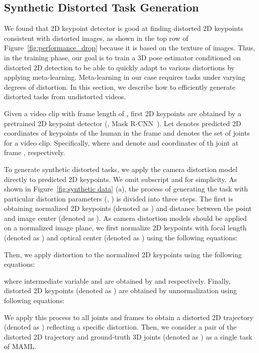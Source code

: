     \subsection{Synthetic Distorted Task Generation}
        \label{sec1}
        We found that 2D keypoint detector is good at finding distorted 2D keypoints consistent with distorted images, as shown in the top row of Figure~\ref{fig:performance_drop} because it is based on the texture of images. Thus, in the training phase, our goal is to train a 3D pose estimator conditioned on distorted 2D detection to be able to quickly adapt to various distortions by applying meta-learning. Meta-learning in our case requires tasks under varying degrees of distortion. In this section, we describe how to efficiently generate distorted tasks from undistorted videos.
        
        Given a video clip with frame length of , first 2D keypoints are obtained by a pretrained 2D keypoint detector (\eg, Mask R-CNN~\cite{ref14_He_2017_ICCV}). Let  denotes predicted 2D coordinates of  keypoints of the human in the frame and  denotes the set of joints for a video clip. Specifically,  where  and  denote  and  coordinates of th joint at frame , respectively.
        
        To generate synthetic distorted tasks, we apply the camera distortion model~\cite{ref38_CamCalibration} directly to predicted 2D keypoints. We omit subscript  and  for simplicity. As shown in Figure~\ref{fig:synthetic data} (a), the process of generating the task with particular distortion parameters (\ie, ) is divided into three steps. The first is obtaining normalized 2D keypoints (denoted as ) and distance between the point and image center (denoted as ). As camera distortion models should be applied on a normalized image plane, we first normalize 2D keypoints with focal length (denoted as ) and optical center (denoted as ) using the following equations:
        
        Then, we apply distortion to the normalized 2D keypoints using the following equations:
        
        where intermediate variable  and  are obtained by \small \normalsize and \small \normalsize respectively. Finally, distorted 2D keypoints (denoted as ) are obtained by unnormalization using following equations:
        
        
        We apply this process to all joints  and frames  to obtain a distorted 2D trajectory (denoted as ) reflecting a specific distortion. Then, we consider a pair of the distorted 2D trajectory and ground-truth 3D joints (denoted as ) as a single task  of MAML.
        
